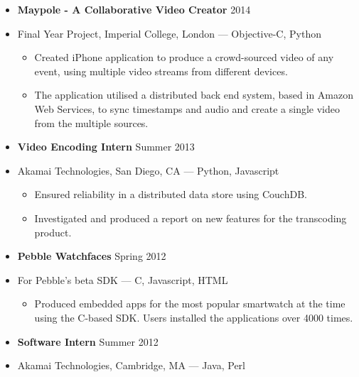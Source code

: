 \documentclass[line,margin]{res}
\newcommand\oindent{0em}
\newcommand\lindent{1.5em}
\newcommand\spacing{0.6em}
\newcommand\si{\item[]}
\newenvironment{secretlist}[1]{\begin{itemize}[noitemsep,leftmargin=#1,nolistsep]}{\end{itemize}}
\begin{document}
\begin{resume}
            \vspace{\spacing}
            \begin{secretlist}{\oindent}
                \si \textbf{Maypole - A Collaborative Video Creator} \hfill 2014
                \si Final Year Project, Imperial College, London --- Objective-C, Python
                \begin{secretlist}{\lindent}
                    \si Created iPhone application to produce a crowd-sourced video of any event, using multiple video streams from different devices.
                    \si The application utilised a distributed back end system, based in Amazon Web Services, to sync timestamps and audio and create a single video from the multiple sources.
                \end{secretlist}
            \end{secretlist}
            \vspace{\spacing}
            \begin{secretlist}{\oindent}
                \si \textbf{Video Encoding Intern} \hfill Summer 2013
                \si Akamai Technologies, San Diego, CA --- Python, Javascript
                \begin{secretlist}{\lindent}
                    \si Ensured reliability in a distributed data store using CouchDB.
                    \si Investigated and produced a report on new features for the transcoding product.
                \end{secretlist}
            \end{secretlist}
            \vspace{\spacing}
            \begin{secretlist}{\oindent}
                \si \textbf{Pebble Watchfaces} \hfill Spring 2012
                \si For Pebble's beta SDK --- C, Javascript, HTML
                \begin{secretlist}{\lindent}
                    \si Produced embedded apps for the most popular smartwatch at the time using the C-based SDK. Users installed the applications over 4000 times.
                \end{secretlist}
            \end{secretlist}
            \vspace{\spacing}
            \begin{secretlist}{\oindent}
                \si \textbf{Software Intern} \hfill Summer 2012
                \si Akamai Technologies, Cambridge, MA --- Java, Perl
                \begin{secretlist}{\lindent}

\end{secretlist}
\end{secretlist}
\end{resume}
\end{document}
